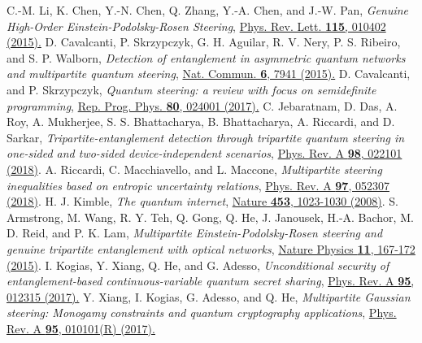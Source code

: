 \documentclass[pra,a4paper,aps,twocolumn,showpacs,superscriptaddress,groupedaddress]{revtex4}
\begin{document}
\begin{thebibliography}{1}
 C.-M. Li, K. Chen, Y.-N. Chen, Q. Zhang, Y.-A. Chen, and J.-W. Pan, \emph{Genuine High-Order Einstein-Podolsky-Rosen Steering}, \href{https://journals.aps.org/prl/abstract/10.1103/PhysRevLett.115.010402}{Phys. Rev. Lett. {\bf 115}, 010402 (2015).}
 D. Cavalcanti, P. Skrzypczyk, G. H. Aguilar, R. V. Nery, P. S. Ribeiro, and S. P. Walborn, \emph{Detection of entanglement in asymmetric quantum networks and multipartite quantum steering}, \href{https://www.nature.com/articles/ncomms8941}{Nat. Commun. {\bf 6}, 7941 (2015).}
 D. Cavalcanti, and P. Skrzypczyk, \emph{Quantum steering: a review with focus on semidefinite programming}, \href{http://iopscience.iop.org/article/10.1088/1361-6633/80/2/024001/meta}{Rep. Prog. Phys. \textbf{80}, 024001 (2017).}
 C. Jebaratnam, D. Das, A. Roy, A. Mukherjee, S. S. Bhattacharya, B. Bhattacharya, A. Riccardi, and D. Sarkar, \emph{Tripartite-entanglement detection through tripartite quantum steering in one-sided and two-sided device-independent scenarios},  \href{https://journals.aps.org/pra/abstract/10.1103/PhysRevA.98.022101}{Phys. Rev. A {\bf 98}, 022101 (2018)}.
 A. Riccardi, C. Macchiavello, and L. Maccone, \emph{Multipartite steering inequalities based on entropic uncertainty relations},  \href{https://journals.aps.org/pra/abstract/10.1103/PhysRevA.97.052307}{Phys. Rev. A {\bf 97}, 052307 (2018)}.
 H. J. Kimble, \emph{The quantum internet}, \href{https://www.nature.com/articles/nature07127}{Nature {\bf 453}, 1023-1030 (2008)}.
 S. Armstrong, M. Wang, R. Y. Teh, Q. Gong, Q. He, J. Janousek, H.-A. Bachor, M. D. Reid, and P. K. Lam, \emph{Multipartite Einstein-Podolsky-Rosen steering and genuine tripartite entanglement with optical networks}, \href{https://www.nature.com/articles/nphys3202}{Nature Physics {\bf 11}, 167-172 (2015)}.
 I. Kogias, Y. Xiang, Q. He, and G. Adesso, \emph{Unconditional security of entanglement-based continuous-variable quantum secret sharing}, \href{https://journals.aps.org/pra/abstract/10.1103/PhysRevA.95.012315}{Phys. Rev. A {\bf 95}, 012315 (2017).}
 Y. Xiang, I. Kogias, G. Adesso, and Q. He, \emph{Multipartite Gaussian steering: Monogamy constraints and quantum cryptography applications}, \href{https://journals.aps.org/pra/abstract/10.1103/PhysRevA.95.010101}{Phys. Rev. A {\bf 95}, 010101(R) (2017).}


\end{thebibliography}
\end{document}

